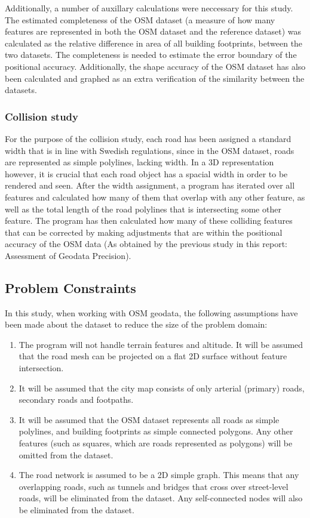 \documentclass[a4paper]{article}
\begin{document}
Additionally, a number of auxillary calculations were neccessary for this study.
The estimated completeness of the OSM dataset (a measure of how many features are represented in both the OSM dataset and the reference dataset) was calculated as the relative difference in area of all building footprints, between the two datasets.
The completeness is needed to estimate the error boundary of the positional accuracy.
Additionally, the shape accuracy of the OSM dataset has also been calculated and graphed as an extra verification of the similarity between the datasets.

\subsubsection{Collision study}

For the purpose of the collision study, each road has been assigned a standard width that is in line with Swedish regulations, since in the OSM dataset, roads are represented as simple polylines, lacking width.
In a 3D representation however, it is crucial that each road object has a spacial width in order to be rendered and seen.
After the width assignment, a program has iterated over all features and calculated how many of them that overlap with any other feature, as well as the total length of the road polylines that is intersecting some other feature.
The program has then calculated how many of these colliding features that can be corrected by making adjustments that are within the positional accuracy of the OSM data (As obtained by the previous study in this report: Assessment of Geodata Precision).

\subsection{Problem Constraints}

In this study, when working with OSM geodata, the following assumptions have been made about the dataset to reduce the size of the problem domain:

\begin{enumerate}
    \item The program will not handle terrain features and altitude. It will be assumed that the road mesh can be projected on a flat 2D surface without feature intersection.
    \item It will be assumed that the city map consists of only arterial (primary) roads, secondary roads and footpaths.
    \item It will be assumed that the OSM dataset represents all roads as simple polylines, and building footprints as simple connected polygons. Any other features (such as squares, which are roads represented as polygons) will be omitted from the dataset.
    \item The road network is assumed to be a 2D simple graph. This means that any overlapping roads, such as tunnels and bridges that cross over street-level roads, will be eliminated from the dataset. Any self-connected nodes will also be eliminated from the dataset.
\end{enumerate}
\end{document}
